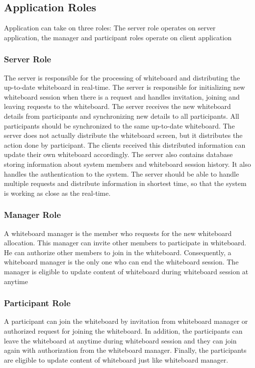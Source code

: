\documentclass[conference]{IEEEtran}
\begin{document}
\subsection{Application Roles}

Application can take on three roles: The server role operates on server application, the manager and participant roles operate on client application

\subsubsection{Server Role}

The server is responsible for the processing of whiteboard and distributing the up-to-date whiteboard in real-time. 
The server is responsible for initializing new whiteboard session when there is a request and handles invitation, joining and leaving requests to the whiteboard. 
The server receives the new whiteboard details from participants and synchronizing new details to all participants. 
All participants should be synchronized to the same up-to-date whiteboard. 
The server does not actually distribute the whiteboard screen, but it distributes the action done by participant. 
The clients received this distributed information can update their own whiteboard accordingly. 
The server also contains database storing information about system members and whiteboard session history. 
It also handles the authentication to the system. 
The server should be able to handle multiple requests and distribute information in shortest time, so that the system is working as close as the real-time.

\subsubsection{Manager Role}

A whiteboard manager is the member who requests for the new whiteboard allocation.
This manager can invite other members to participate in whiteboard. 
He can authorize other members to join in the whiteboard. 
Consequently, a whiteboard manager is the only one who can end the whiteboard session. 
The manager is eligible to update content of whiteboard during whiteboard session at anytime

\subsubsection{Participant Role}
A participant can join the whiteboard by invitation from whiteboard manager or authorized request for joining the whiteboard. 
In addition, the participants can leave the whiteboard at anytime during whiteboard session and they can join again with authorization from the whiteboard manager. 
Finally, the participants are eligible to update content of whiteboard just like whiteboard manager.
\end{document}
